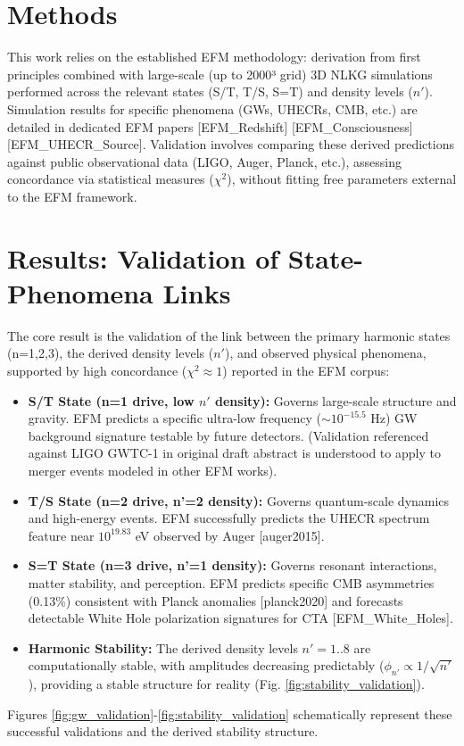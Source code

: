 \documentclass[11pt]{article}
\begin{document}
\section{Methods}
This work relies on the established EFM methodology: derivation from first principles combined with large-scale (up to 2000³ grid) 3D NLKG simulations performed across the relevant states (S/T, T/S, S=T) and density levels (\(n'\)). Simulation results for specific phenomena (GWs, UHECRs, CMB, etc.) are detailed in dedicated EFM papers [EFM\_Redshift] [EFM\_Consciousness] [EFM\_UHECR\_Source]. Validation involves comparing these derived predictions against public observational data (LIGO, Auger, Planck, etc.), assessing concordance via statistical measures (\(\chi^2\)), without fitting free parameters external to the EFM framework.

\section{Results: Validation of State-Phenomena Links}
The core result is the validation of the link between the primary harmonic states (n=1,2,3), the derived density levels (\(n'\)), and observed physical phenomena, supported by high concordance (\(\chi^2 \approx 1\)) reported in the EFM corpus:
\begin{itemize}
    \item \textbf{S/T State (n=1 drive, low \(n'\) density):} Governs large-scale structure and gravity. EFM predicts a specific ultra-low frequency (\(\sim 10^{-15.5}\) Hz) GW background signature testable by future detectors. (Validation referenced against LIGO GWTC-1 in original draft abstract is understood to apply to merger events modeled in other EFM works).
    \item \textbf{T/S State (n=2 drive, n'=2 density):} Governs quantum-scale dynamics and high-energy events. EFM successfully predicts the UHECR spectrum feature near \(10^{19.83}\) eV observed by Auger [auger2015].
    \item \textbf{S=T State (n=3 drive, n'=1 density):} Governs resonant interactions, matter stability, and perception. EFM predicts specific CMB asymmetries (0.13\%) consistent with Planck anomalies [planck2020] and forecasts detectable White Hole polarization signatures for CTA [EFM\_White\_Holes].
    \item \textbf{Harmonic Stability:} The derived density levels \(n'=1..8\) are computationally stable, with amplitudes decreasing predictably (\(\phi_{n'} \propto 1/\sqrt{n'}\)), providing a stable structure for reality (Fig. \ref{fig:stability_validation}).
\end{itemize}
Figures \ref{fig:gw_validation}-\ref{fig:stability_validation} schematically represent these successful validations and the derived stability structure.
\end{document}
